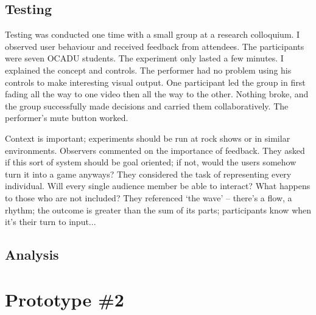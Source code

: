 \subsection{Testing}

Testing was conducted one time with a small group at a research colloquium. I observed user behaviour and received feedback from attendees. The participants were seven OCADU students. The experiment only lasted a few minutes. I explained the concept and controls. The performer had no problem using his controls to make interesting visual output. One participant led the group in first fading all the way to one video then all the way to the other. Nothing broke, and the group successfully made decisions and carried them collaboratively. The performer's mute button worked.

Context is important; experiments should be run at rock shows or in similar environments. Observers commented on the importance of feedback. They asked if this sort of system should be goal oriented; if not, would the users somehow turn it into a game anyways? They considered the task of representing every individual. Will every single audience member be able to interact? What happens to those who are not included? They referenced `the wave' -- there's a flow, a rhythm; the outcome is greater than the sum of its parts; participants know when it's their turn to input...

\subsection{Analysis}



\section{Prototype \#2}

